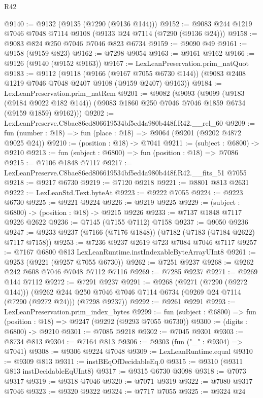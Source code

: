 \begin{lexlean}{R42}
\begin{coremodule}
{@9140 := @9132 (@9135 (@7290 (@9136 @144)))
@9152 := @9083 @244 @1219 @7046 @7048 @7114 @9108 (@9133 @24 @7114 (@7290 (@9136 @24)))
@9158 := @9083 @824 @250 @7046 @7046 @823 @6734
@9159 := @9090 @49
@9161 := @9158 (@9159 @823)
@9162 := @7298 @9054
@9163 := @9161 @9162
@9166 := @9126 (@9140 (@9152 @9163))
@9167 := LexLeanPreservation.prim_natQuot
@9183 := @9112
    (@9118
      (@9166 (@9167 @7055 @6730 @144))
      (@9083 @2408 @1219 @7046 @7048 @2407 @9108 (@9159 @2407) @9163))
@9184 := LexLeanPreservation.prim_natRem
@9201 := @9082
    (@9093
      (@9099
        (@9183 (@9184 @9022 @182 @144))
        (@9083 @1860 @250 @7046 @7046 @1859 @6734 (@9159 @1859) @9162)))
@9202 := LexLeanPreserve.C8bae86ed806619534bf5ed4a980b448f.R42.__rel_60
@9209 := fun (number : @18) => fun (place : @18) => @9064 (@9201 (@9202 @4872 @9025 @24))
@9210 := (position : @18) -> @7041
@9211 := (subject : @6800) -> @9210
@9213 := fun (subject : @6800) => fun (position : @18) => @7086
@9215 := @7106 @1848 @7117
@9217 := LexLeanPreserve.C8bae86ed806619534bf5ed4a980b448f.R42.__fits_51 @7055
@9218 := @9217 @6730
@9219 := @7120 @9218
@9221 := @8801 @813 @2631
@9222 := LexLeanStd.Text.byteAt
@9223 := @9222 @7055
@9224 := @9223 @6730
@9225 := @9221 @9224
@9226 := @9219 @9225
@9229 := (subject : @6800) -> (position : @18) -> @9215 @9226
@9233 := @7137 @1848 @7117 @9226 @2622
@9236 := @7145 (@7155 @7112) @7158
@9237 := @9050 @9236
@9247 := @9233 @9237 (@7166 (@7176 @1848)) (@7182 (@7183 (@7184 @2622) @7117 @7158))
@9253 := @7236 @9237 @2619 @723 @7084 @7046 @7117
@9257 := @7167 @6800 @813 LexLeanRuntime.instIndexableByteArrayUInt8
@9261 := @9253 (@9221 (@9257 @7055 @6730))
@9262 := @7251 @9237
@9268 := @9262 @242 @608 @7046 @7048 @7112 @7116
@9269 := @7285 @9237
@9271 := @9269 @144 @7112
@9272 := @7291 @9237
@9291 := @9268
    (@9271 (@7290 (@9272 @144)))
    (@9262 @244 @250 @7046 @7046 @7114 @6734 (@9269 @24 @7114 (@7290 (@9272 @24))) (@7298 @9237))
@9292 := @9261 @9291
@9293 := LexLeanPreservation.prim_index_bytes
@9299 := fun (subject : @6800) => fun (position : @18) => @9247 (@9292 (@9293 @7055 @6730))
@9300 := (digits : @6800) -> @9210
@9301 := @7085 @9218
@9302 := @7045 @9301
@9303 := @8734 @813
@9304 := @7164 @813
@9306 := @9303 (fun ("_" : @9304) => @7041)
@9308 := @9306 @9224 @7048
@9309 := LexLeanRuntime.equal
@9310 := @9309 @813
@9311 := instBEqOfDecidableEq.{0}
@9315 := @9310 (@9311 @813 instDecidableEqUInt8)
@9317 := @9315 @6730 @3098
@9318 := @7073 @9317
@9319 := @9318 @7046
@9320 := @7071 @9319
@9322 := @7080 @9317 @7046
@9323 := @9320 @9322
@9324 := @7717 @7055
@9325 := @9324 @24
}
\end{coremodule}
\end{lexlean}
